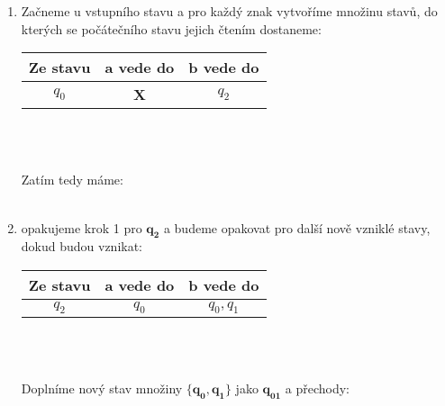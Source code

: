 \documentclass{report}
\begin{document}
\begin{enumerate}
    \item Začneme u vstupního stavu a pro každý znak vytvoříme množinu stavů, do kterých se počátečního stavu jejich čtením dostaneme: \\
    \begin{center}
    \begin{tabular}{c|c|c}
         \textbf{Ze stavu}& \textbf{a vede do} & \textbf{b vede do}  \\ \hline
         $q_0$& \textbf{X} & $q_2$ \\
    \end{tabular}\\ \\
    \end{center}
    Zatím tedy máme: \\ \\
    \begin{center}
    \end{center}
    \item opakujeme krok 1 pro $\mathbf{q_2}$ a budeme opakovat pro další nově vzniklé stavy, dokud budou vznikat:\\
    \begin{center}
    \begin{tabular}{c|c|c}
         \textbf{Ze stavu}& \textbf{a vede do} & \textbf{b vede do}  \\ \hline
         $q_2$& $q_0$ & $q_0, q_1$ \\
    \end{tabular}\\ \\
    \end{center}
    Doplníme nový stav množiny $\mathbf{\{q_0, q_1\}}$ jako $\mathbf{q_{01}}$ a přechody:\\ \\
    \begin{center}
\end{center}
\end{enumerate}
\end{document}
